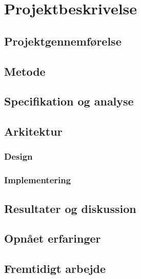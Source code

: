 \chapter{Projektbeskrivelse}

\section{Projektgennemførelse}

\section{Metode}

\section{Specifikation og analyse}

\section{Arkitektur}

\subsection{Design}

\subsection{Implementering}

\section{Resultater og diskussion}

\section{Opnået erfaringer}

\section{Fremtidigt arbejde}